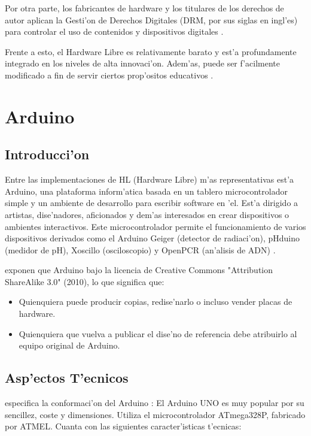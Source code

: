 Por otra parte, los fabricantes de hardware y los titulares de los derechos de
autor aplican la Gesti'on de Derechos Digitales (DRM, por sus siglas en
ingl'es) para controlar el uso de contenidos y dispositivos digitales \citep{lazalde}.

Frente a esto, el Hardware Libre es relativamente barato y est'a profundamente integrado en los niveles de
alta innovaci'on. Adem'as, puede ser f'acilmente modificado a fin de
servir ciertos prop'ositos educativos \citep{lazalde}.


\section{Arduino}
\subsection{Introducci'on}
Entre las implementaciones de HL (Hardware Libre) m'as representativas est'a Arduino, una plataforma
inform'atica basada en un tablero microcontrolador simple y un ambiente de desarrollo para
escribir software en 'el. Est'a dirigido a artistas, dise'nadores, aficionados y
dem'as interesados en crear dispositivos o ambientes interactivos. Este microcontrolador
permite el funcionamiento de varios dispositivos derivados como el Arduino Geiger
(detector de radiaci'on), pHduino (medidor de pH), Xoscillo (osciloscopio) y OpenPCR
(an'alisis de ADN) \citep{lazalde}.

\citet{lazalde} exponen que Arduino bajo la licencia de Creative Commons "Attribution ShareAlike 3.0" (2010), lo que
significa que:
\begin{itemize}
	\item Quienquiera puede producir copias, redise'narlo o incluso vender placas de hardware.

\item Quienquiera que vuelva a publicar el dise'no de referencia debe atribuirlo al equipo original de Arduino.

\end{itemize}

\subsection{Asp'ectos T'ecnicos}


\citet{garcia} especifica la conformaci'on del Arduino :
El Arduino UNO es muy popular por su sencillez, coste y
dimensiones. Utiliza el microcontrolador ATmega328P, fabricado por ATMEL. Cuanta con las siguientes caracter'isticas t'ecnicas:


